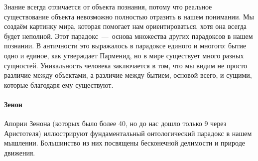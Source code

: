 
Знание всегда отличается от объекта познания, потому что реальное существование объекта невозможно полностью отразить в нашем понимании. Мы создаём картинку мира, которая помогает нам ориентироваться, хотя она всегда будет неполной. Этот парадокс~---~основа множества других парадоксов в нашем познании. В античности это выражалось в парадоксе единого и многого: бытие одно и единое, как утверждает Парменид, но в мире существует много разных сущностей. Уникальность человека заключается в том, что мы видим не просто различие между объектами, а различие между бытием, основой всего, и сущими, которые благодаря ему существуют.

\paragraph{Зенон}
Апории Зенона (которых было более 40, но до нас дошло только 9 через Аристотеля) иллюстрируют фундаментальный онтологический парадокс в нашем мышлении. Большинство из них посвящены бесконечной делимости и природе движения.


